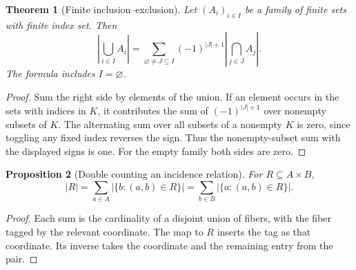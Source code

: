 \documentclass[11pt,oneside,openany]{book}
\theoremstyle{plain}
\newtheorem{theorem}{Theorem}[chapter]
\newtheorem{proposition}[theorem]{Proposition}
\theoremstyle{definition}
\theoremstyle{remark}
\begin{document}
\begin{theorem}[Finite inclusion--exclusion]\label{p204:W02}
Let \((A_i)_{i\in I}\) be a family of finite sets with finite index set.
Then
\[
 \left|\bigcup_{i\in I} A_i\right|
 =\sum_{\varnothing\ne J\subseteq I}
       (-1)^{|J|+1}\left|\bigcap_{j\in J} A_j\right|.
\]
The formula includes \(I=\varnothing\).
\end{theorem}
\begin{proof}
Sum the right side by elements of the union. If an element occurs
in the sets with indices in \(K\), it contributes the sum of
\((-1)^{|J|+1}\) over nonempty subsets of \(K\). The alternating
sum over all subsets of a nonempty \(K\) is zero, since toggling any
fixed index reverses the sign. Thus the nonempty-subset sum with
the displayed signs is one. For the empty family both sides are
zero.
\end{proof}

\begin{proposition}[Double counting an incidence relation]\label{p204:W03}
For \(R\subseteq A\times B\),
\[
 |R|=\sum_{a\in A}|\{b:(a,b)\in R\}|
     =\sum_{b\in B}|\{a:(a,b)\in R\}|.
\]
\end{proposition}
\begin{proof}
Each sum is the cardinality of a disjoint union of fibers, with
the fiber tagged by the relevant coordinate. The map to \(R\)
inserts the tag as that coordinate. Its inverse takes the coordinate
and the remaining entry from the pair.
\end{proof}
\end{document}
